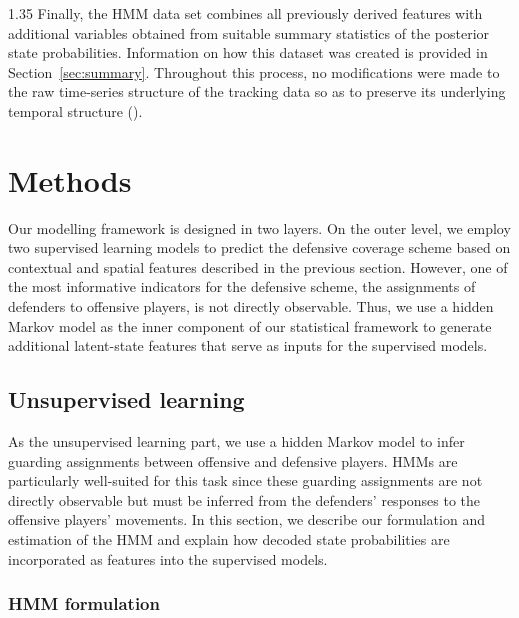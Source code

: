 \documentclass[12pt,a4paper]{article}
\begin{document}
\begin{spacing}{1.35}
Finally, the HMM data set combines all previously derived features with additional variables obtained from suitable summary statistics of the posterior state probabilities. Information on how this dataset was created is provided in Section~\ref{sec:summary}. Throughout this process, no modifications were made to the raw time-series structure of the tracking data so as to preserve its underlying temporal structure (\citealp{michels2024combination}).

\section{Methods}\label{sec:methods}

Our modelling framework is designed in two layers. On the outer level, we employ two supervised learning models to predict the defensive coverage scheme based on contextual and spatial features described in the previous section. However, one of the most informative indicators for the defensive scheme, the assignments of defenders to offensive players, is not directly observable. Thus, we use a hidden Markov model as the inner component of our statistical framework to generate additional latent-state features that serve as inputs for the supervised models.

\subsection{Unsupervised learning}
As the unsupervised learning part, we use a hidden Markov model to infer guarding assignments between offensive and defensive players. HMMs are particularly well-suited for this task since these guarding assignments are not directly observable but must be inferred from the defenders' responses to the offensive players' movements. 
In this section, we describe our formulation and estimation of the HMM and explain how decoded state probabilities are incorporated as features into the supervised models.

\subsubsection{HMM formulation}


\end{spacing}
\end{document}
